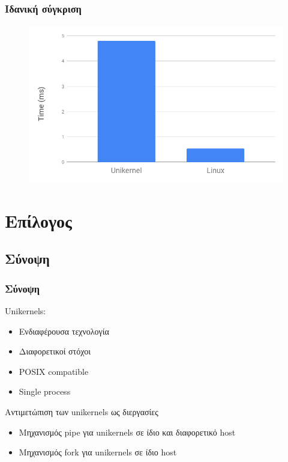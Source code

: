 \documentclass[red,slidestop,notes,compress,mathserif]{beamer}
\begin{document}
\begin{frame}
\frametitle{Ιδανική σύγκριση}
\begin{figure}
\center
\includegraphics[scale=0.45]{figures/ideal_comparison.png}
\end{figure}
\end{frame}

\section*{Επίλογος}

\subsection*{Σύνοψη}

\begin{frame}
\frametitle{Σύνοψη}
Unikernels:
\begin{itemize}
\item Ενδιαφέρουσα τεχνολογία
\item Διαφορετικοί στόχοι 
\item POSIX compatible
\item Single process
\end{itemize}
\begin{block}{Αντιμετώπιση των unikernels ως διεργασίες}
\begin{itemize}
\item Μηχανισμός pipe για unikernels σε ίδιο και διαφορετικό host
\item Μηχανισμός fork για unikernels σε ίδιο host
\end{itemize}
\end{block}
\end{frame}
\end{document}
